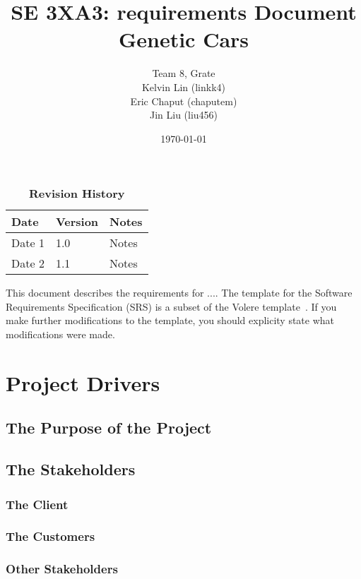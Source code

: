 \documentclass[12pt, titlepage]{article}
\title{SE 3XA3: requirements Document\\Genetic Cars}
\author{Team 8, Grate
		\\ Kelvin Lin (linkk4)
		\\ Eric Chaput (chaputem)
		\\ Jin Liu (liu456)
}
\date{\today}
\begin{document}
\maketitle

\tableofcontents
\listoftables
\listoffigures

\begin{table}[bp]
\caption{\bf Revision History}
\begin{tabularx}{\textwidth}{p{3cm}p{2cm}X}
\toprule {\bf Date} & {\bf Version} & {\bf Notes}\\
\midrule
Date 1 & 1.0 & Notes\\
Date 2 & 1.1 & Notes\\
\bottomrule
\end{tabularx}
\end{table}

\newpage


This document describes the requirements for ....  The template for the Software
Requirements Specification (SRS) is a subset of the Volere
template~\citep{RobertsonAndRobertson2012}.  If you make further modifications
to the template, you should explicity state what modifications were made.

\section{Project Drivers}

\subsection{The Purpose of the Project}

\subsection{The Stakeholders}

\subsubsection{The Client}

\subsubsection{The Customers}

\subsubsection{Other Stakeholders}
\end{document}
